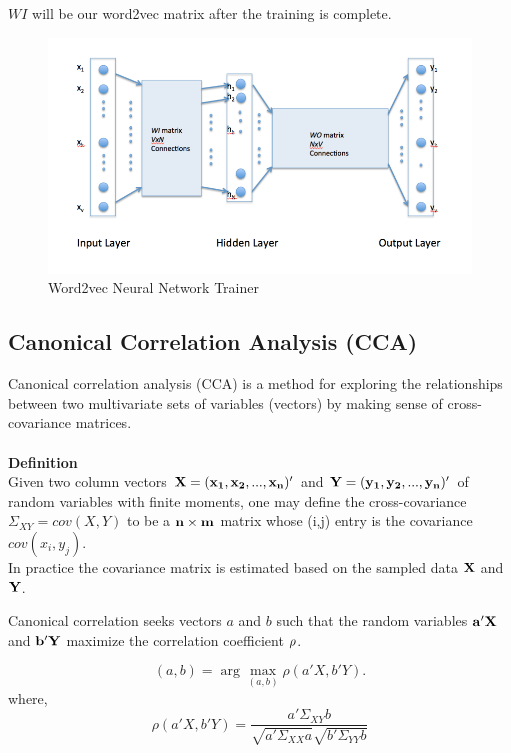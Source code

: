 \documentclass{article} %
\begin{document}
	$WI$ will be our word2vec matrix after the training is complete.
	
	\begin{figure}[H]
		\begin{center}
			\includegraphics[scale = 0.6]{Figures/word2vecNN.png}
			\caption{Word2vec Neural Network Trainer}
			\label{fig:word2vecNN}
		\end{center}
	\end{figure}
	
	\subsection{Canonical Correlation Analysis (CCA)}
	
	Canonical correlation analysis (CCA) is a method for exploring the relationships between two multivariate sets of variables (vectors) by making sense of cross-covariance matrices.
	\\\\
	{\bf Definition}\\
	Given two column vectors $\bf{{X} = (x_1, x_2,..., x_n)'}$ and  $\bf{{Y} = (y_1, y_2,..., y_n)'}$ of random variables with finite moments, one may define the cross-covariance ${\Sigma_{XY}} = cov({X},{Y})$ to be a ${{\bf n}\times{\bf m}}$ matrix whose (i,j) entry is the covariance $cov(x_i,y_j)$.\\
	In practice the covariance matrix is estimated based on the sampled data $\bf{X}$ and $\bf{Y}$.
	
	
	Canonical correlation seeks vectors ${a}$ and ${b}$ such that the random variables $\bf{a'X}$ and $\bf{b'Y}$ maximize the correlation coefficient ${\bf \rho}$.
	
	\begin{equation}
	(a,b) = \arg \max_{(a,b)} {\rho}({a'X},{b'Y}).
	\end{equation}
	where,
	\begin{equation}	
	\rho({a'X},{b'Y}) = \frac{a' \Sigma_{XY} b}{\sqrt{a'\Sigma_{XX}a}\sqrt{b'\Sigma_{YY}b}}	
	\end{equation}
	
\end{document}
